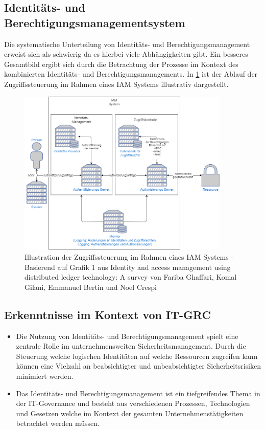 \documentclass[11pt]{article}
\begin{document}
\subsection{Identitäts- und Berechtigungsmanagementsystem}
Die systematische Unterteilung von Identitäts- und Berechtigungsmanagement erweist sich als schwierig da es hierbei viele Abhängigkeiten gibt. Ein besseres Gesamtbild ergibt sich durch die Betrachtung der Prozesse im Kontext des kombinierten Identitäts- und Berechtigungsmanagements. In \cref{figure:iam} ist der Ablauf der Zugriffssteuerung im Rahmen eines IAM Systems illustrativ dargestellt.
\begin{figure}[H]
  \centering
  \includegraphics[width=0.9\textwidth]{assets/accessmanagement2.png}
  \caption{Illustration der Zugriffssteuerung im Rahmen eines IAM Systems - Basierend auf Grafik 1 aus Identity and access management using distributed ledger technology: A survey von Fariba Ghaffari, Komal Gilani, Emmanuel Bertin und Noel Crespi}\label{figure:iam}
\end{figure}
\subsection{Erkenntnisse im Kontext von IT-GRC}
\begin{itemize}
  \item Die Nutzung von Identitäts- und Berechtigungsmanagement spielt eine zentrale Rolle im unternehmensweiten Sicherheitsmanagement. Durch die Steuerung welche logischen Identitäten auf welche Ressourcen zugreifen kann können eine Vielzahl an beabsichtigter und unbeabsichtigter Sicherheitsrisiken minimiert werden.
  \item Das Identitäts- und Berechtigungsmanagement ist ein tiefgreifendes Thema in der IT-Governance und besteht aus verschiedenen Prozessen, Technologien und Gesetzen welche im Kontext der gesamten Unternehmenstätigkeiten betrachtet werden müssen.
\end{itemize}
\end{document}
